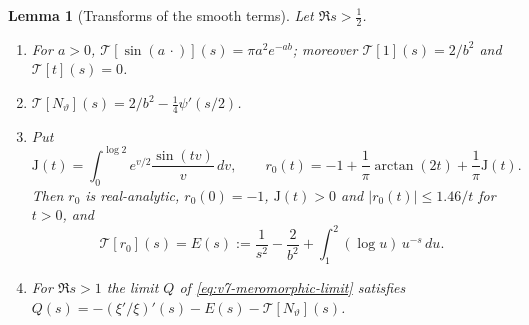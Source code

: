 \documentclass[11pt,a4paper]{article}
\numberwithin{equation}{section}
\newtheorem{lemma}[theorem]{Lemma}
\theoremstyle{definition}
\theoremstyle{remark}
\begin{document}
\begin{lemma}[Transforms of the smooth terms]\label{lem:v8-smooth}
Let $\Re s>\frac12$.
\begin{enumerate}[label=(\roman*),leftmargin=*]
\item For $a>0$, $\mathcal T[\sin(a\,\cdot)](s)=\pi a^2e^{-ab}$;
 moreover $\mathcal T[1](s)=2/b^2$ and $\mathcal T[t](s)=0$.
\item $\mathcal T[N_\vartheta](s)=2/b^2-\tfrac14\psi'(s/2)$.
\item Put
\begin{equation}\label{eq:v8-r0}
 \mathrm J(t)=\int_0^{\log2}e^{v/2}\frac{\sin(tv)}{v}\,dv,\qquad
 r_0(t)=-1+\frac1\pi\arctan(2t)+\frac1\pi \mathrm J(t).
\end{equation}
Then $r_0$ is real-analytic, $r_0(0)=-1$, $\mathrm J(t)>0$ and
$|r_0(t)|\le1.46/t$ for $t>0$, and
\begin{equation}\label{eq:v8-E}
 \mathcal T[r_0](s)=E(s):=\frac1{s^2}-\frac2{b^2}
 +\int_1^2(\log u)\,u^{-s}\,du .
\end{equation}
\item For $\Re s>1$ the limit $Q$ of \eqref{eq:v7-meromorphic-limit}
 satisfies $Q(s)=-(\xi'/\xi)'(s)-E(s)-\mathcal T[N_\vartheta](s)$.
\end{enumerate}
\end{lemma}
\end{document}
